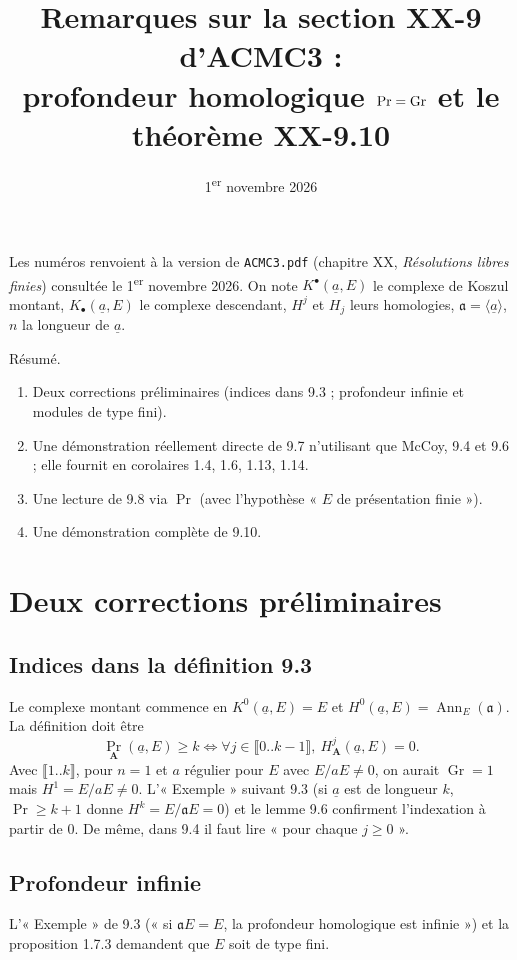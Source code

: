 \documentclass[11pt]{amsart}
\title{Remarques sur la section XX-9 d'ACMC3 :\\
profondeur homologique $\Pr=\Gr$ et le théorème XX-9.10}
\date{1\textsuperscript{er} novembre 2026}
\theoremstyle{definition}
\theoremstyle{remark}
\DeclareMathOperator{\Ann}{Ann}
\DeclareMathOperator{\Gr}{Gr}
\renewcommand{\Pr}{\operatorname{Pr}}
\newcommand{\A}{\mathbf{A}}
\newcommand{\ua}{\underline{a}}
\newcommand{\fa}{\mathfrak{a}}
\newcommand{\iv}[1]{\llbracket #1\rrbracket}
\begin{document}
\maketitle

\noindent Les numéros renvoient à la version de \texttt{ACMC3.pdf}
(chapitre XX, \emph{Résolutions libres finies}) consultée le 1\textsuperscript{er}
novembre 2026. On note $K^\bullet(\ua,E)$ le complexe de Koszul montant,
$K_\bullet(\ua,E)$ le complexe descendant, $H^j$ et $H_j$ leurs homologies,
$\fa=\langle\ua\rangle$, $n$ la longueur de $\ua$.

Résumé.
\begin{enumerate}
\item Deux corrections préliminaires (indices dans 9.3 ; profondeur infinie
  et modules de type fini).
\item Une démonstration réellement directe de 9.7 n'utilisant que McCoy,
  9.4 et 9.6 ; elle fournit en corolaires 1.4, 1.6, 1.13, 1.14.
\item Une lecture de 9.8 via $\Pr$ (avec l'hypothèse « $E$ de présentation
  finie »).
\item Une démonstration complète de 9.10.
\end{enumerate}

\section{Deux corrections préliminaires}

\subsection{Indices dans la définition 9.3}
Le complexe montant commence en $K^0(\ua,E)=E$ et
$H^0(\ua,E)=\Ann_E(\fa)$. La définition doit être
\[
\Pr_\A(\ua,E)\ge k\iff \forall j\in\iv{0..k-1},\ H^j_\A(\ua,E)=0 .
\]
Avec $\iv{1..k}$, pour $n=1$ et $a$ régulier pour $E$ avec $E/aE\ne0$, on
aurait $\Gr=1$ mais $H^1=E/aE\ne0$. L'« Exemple » suivant 9.3 (si $\ua$
est de longueur $k$, $\Pr\ge k+1$ donne $H^k=E/\fa E=0$) et le lemme 9.6
confirment l'indexation à partir de $0$. De même, dans 9.4 il faut lire
« pour chaque $j\ge0$ ».

\subsection{Profondeur infinie}
L'« Exemple » de 9.3 (« si $\fa E=E$, la profondeur homologique est
infinie ») et la proposition 1.7.3 demandent que $E$ soit de type fini.
\end{document}
